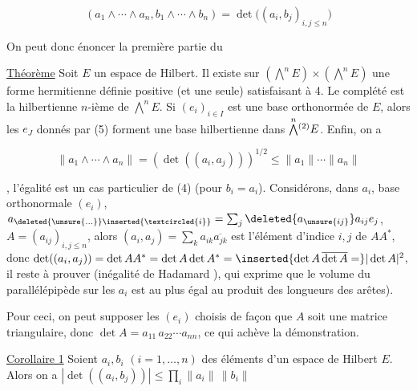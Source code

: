 \[
\boxed{(a_1\wedge\cdots\wedge a_n,b_1\wedge\cdots\wedge b_n)=\det\big((a_i,b_j)_{i,j\leq n}\big)} \tag*{(4)}
\]


On peut donc énoncer la première partie du

 \uline{Théorème} Soit  $E$ un espace de Hilbert. Il existe sur
$(\overset{n}{\bigwedge}E)\times(\overset{n}{\bigwedge}E)$ une forme hermitienne définie positive (et une seule)
satisfaisant à 4. Le complété est la   hilbertienne
$n$-ième de $\overset{n}{\bigwedge}E$.  Si $(e_i)_{i\in I}$ est une base  orthonormée
de $E$, alors les $e_J$ donnés par (5) forment une base
 hilbertienne
 dans $\overset{n}{\bigwedge}\vphantom{\bigwedge}^{(2)}E$. Enfin, on a

\[
\boxed{\|a_1\wedge\cdots\wedge a_n\|=(\det((a_i,a_j)))^{1/2}\leq\|a_1\|\cdots\|a_n\|} \tag*{(5)}
\]

, l'égalité  est un cas particulier de (4) (pour $b_i=a_i$).
Considérons, dans   $a_i$, 
base orthonormale $(e_i)$, 
  $a_{\deleted{\unsure{\ldots}}\inserted{\textcircled{i}}}=\sum_j\deleted{a_{\unsure{ij}}}a_{ij}e_j$,
 $A=(a_{ij})_{i,j\leq n}$, alors $(a_i,a_j)=\sum_k a_{ik}\overline{a_{jk}}$
est l'élément d'indice $i,j$ de  $AA^*$, donc
$\det((a_i,a_j))=\det AA^*=\det A\det A^*=\inserted{\det A\,\overline{\det A}=}|\det A|^2$,  il
reste à prouver  (inégalité
de Hadamard \unsure{!}), qui exprime que le volume du
parallélépipède  sur les $a_i$ est au plus
égal au produit des longueurs des arêtes).


Pour ceci, on peut supposer les $(e_i)$ choisis de façon
que $A$ soit une matrice triangulaire, donc
$\det A=a_{11}\,a_{22}\cdots a_{nn}$, ce qui achève la démonstration.

\uline{Corollaire 1} Soient $a_i,b_i$ $(i=1,\ldots,n)$ des éléments d'un espace
de Hilbert $E$. Alors on a $|\det((a_i,b_j))|\leq\prod_i\|a_i\|\,\|b_i\|$

